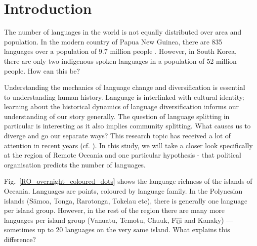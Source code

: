 \documentclass[unnumsec,webpdf,modern,medium]{oup-authoring-template}
\begin{document}



%


\newpage

\onecolumn
\section{Introduction}
\doublespacing

The number of languages in the world is not equally distributed over area and population. In the modern country of Papua New Guinea, there are 835 languages over a population of 9.7 million people \citep{UN_pop, glottolog3}. However, in South Korea, there are only two indigenous spoken languages in a population of 52 million people. How can this be?

Understanding the mechanics of language change and diversification is essential to understanding human history. Language is interlinked with cultural identity; learning about the historical dynamics of language diversification informs our understanding of our story generally. The question of language splitting in particular is interesting as it also implies community splitting. What causes us to diverge and go our separate ways? This research topic has received a lot of attention in recent years (cf. \citet{gavin2017process,  greenhill2015demographic, Pacheco_Coelho_2019, hua2019ecological}). In this study, we will take a closer look specifically at the region of Remote Oceania and one particular hypothesis - that political organisation predicts the number of languages.

Fig.~\ref{RO_overnight_coloured_dots} shows the language richness of the islands of Oceania. Languages are points, coloured by language family. In the Polynesian islands (S\={a}moa, Tonga, Rarotonga, Tokelau etc), there is generally one language per island group. However, in the rest of the region there are many more languages per island group (Vanuatu, Temotu, Chuuk, Fiji and Kanaky) --- sometimes up to 20 languages on the very same island. What explains this difference?
\end{document}
